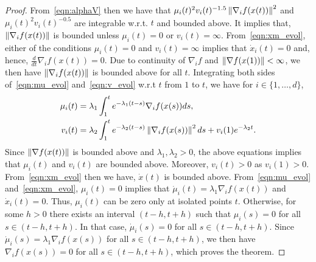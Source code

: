 \begin{proof}

From~\eqref{eqn:alphaV} then we have that $\mu_i(t)^2 v_i(t)^{-1.5} \left\lVert\nabla_i f(x(t))\right\rVert ^2$ and $\mu_i(t)^2 v_i(t)^{-0.5}$ are integrable w.r.t. $t$ and bounded above. It implies that, $\left\lVert\nabla_i f(x(t))\right\rVert $ is bounded unless $\mu_i(t) = 0$ or $v_i(t) = \infty$. From~\eqref{eqn:xm_evol}, either of the conditions $\mu_i(t) = 0$ and $v_i(t) = \infty$ implies that $\dot{x}_i(t) = 0$ and, hence, $\frac{d}{dt}\nabla_i f(x(t)) = 0$. Due to continuity of $\nabla_i f$ and $\left\lVert\nabla f(x(1))\right\rVert  < \infty$, we then have $\left\lVert\nabla_i f(x(t))\right\rVert $ is bounded above for all $t$.
Integrating both sides of~\eqref{eqn:mu_evol} and~\eqref{eqn:v_evol} w.r.t $t$ from $1$ to $t$, we have for $i \in \{1,\ldots,d\}$,
\begin{align*}
    \mu_i(t) & = \lambda_1 \int_1^t e^{-\lambda_1(t-s)} \nabla_i f(x(s)) ds, \\
    v_i(t) & = \lambda_2 \int_1^t e^{-\lambda_2(t-s)} \left\lVert\nabla_i f(x(s))\right\rVert ^2 ds + v_i(1)e^{-\lambda_2t}.
\end{align*}
Since $\left\lVert\nabla f(x(t))\right\rVert $ is bounded above and $\lambda_1,\lambda_2 > 0$, the above equations implies that $\mu_i(t)$ and $v_i(t)$ are bounded above. Moreover, $v_i(t) > 0$ as $v_i(1) > 0$. From~\eqref{eqn:xm_evol} then we have, $\Dot{x}(t)$ is bounded above. From~\eqref{eqn:mu_evol} and~\eqref{eqn:xm_evol}, $\mu_i(t) = 0$ implies that $\dot{\mu}_i(t) = \lambda_1 \nabla_i f(x(t))$ and $\dot{x}_i(t) = 0$. Thus, $\mu_i(t)$ can be zero only at isolated points $t$. Otherwise, for some $h>0$ there exists an interval $(t-h,t+h)$ such that $\mu_i(s) = 0$ for all $s \in (t-h,t+h)$. In that case, $\dot{\mu}_i(s) = 0$ for all $s \in (t-h,t+h)$. Since $\dot{\mu}_i(s) = \lambda_1 \nabla_i f(x(s))$ for all $s \in (t-h,t+h)$, we then have $\nabla_i f(x(s)) = 0$ for all $s \in (t-h,t+h)$, which proves the theorem.


\end{proof}
